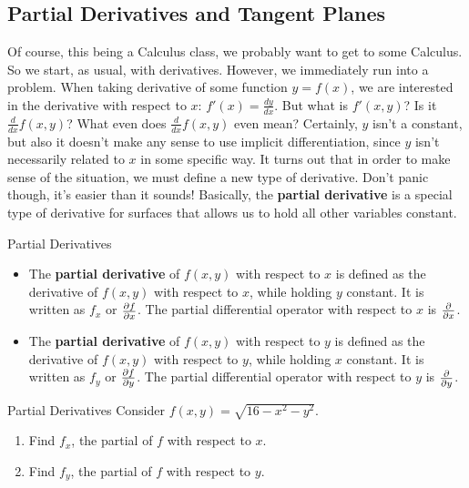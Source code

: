 \subsection{Partial Derivatives and Tangent Planes}
Of course, this being a Calculus class, we probably want to get to some Calculus. So we start, as usual, with derivatives. However, we immediately run into a problem. When taking derivative of some function $y=f(x)$, we are interested in the derivative with respect to $x$: $f'(x)=\frac{dy}{dx}$. But what is $f'(x,y)$? Is it $\frac{d}{dx}f(x,y)$? What even does $\frac{d}{dx}f(x,y)$ even mean? Certainly, $y$ isn't a constant, but also it doesn't make any sense to use implicit differentiation, since $y$ isn't necessarily related to $x$ in some specific way. It turns out that in order to make sense of the situation, we must define a new type of derivative. Don't panic though, it's easier than it sounds! Basically, the \textbf{partial derivative} is a special type of derivative for surfaces that allows us to hold all other variables constant.

\begin{definition}{Partial Derivatives}
\begin{itemize}
\item The \textbf{partial derivative} of $f(x,y)$ with respect to $x$ is defined as the derivative of $f(x,y)$ with respect to $x$, while holding $y$ constant. It is written as $f_x$ or $\frac{\partial f}{\partial x}$. The partial differential operator with respect to $x$ is $\frac{\partial }{\partial x}$. 
\vspace{1em}
\item The \textbf{partial derivative} of $f(x,y)$ with respect to $y$ is defined as the derivative of $f(x,y)$ with respect to $y$, while holding $x$ constant. It is written as $f_y$ or $\frac{\partial f}{\partial y}$. The partial differential operator with respect to $y$ is $\frac{\partial }{\partial y}$. 
\end{itemize}
\end{definition}

\begin{exercise}{Partial Derivatives}
Consider $f(x,y)=\sqrt{16-x^2-y^2}$.
\vspace{1em}
\begin{enumerate}
\item Find $f_x$, the partial of $f$ with respect to $x$.
\vspace{1em}
\item Find $f_y$, the partial of $f$ with respect to $y$.
\end{enumerate}
\end{exercise}

